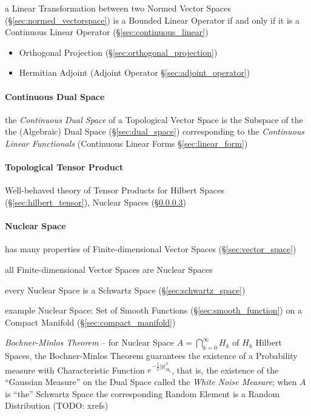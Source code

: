 a Linear Transformation between two Normed Vector Spaces
(\S\ref{sec:normed_vectorspace}) is a Bounded Linear Operator if and
only if it is a Continuous Linear Operator
(\S\ref{sec:continuous_linear})

\begin{itemize}
  \item Orthogonal Projection (\S\ref{sec:orthogonal_projection})
  \item Hermitian Adjoint (Adjoint Operator \S\ref{sec:adjoint_operator})
\end{itemize}



\paragraph{Continuous Dual Space}\label{sec:continuous_dual_space}
\hfill

the \emph{Continuous Dual Space} of a Topological Vector Space is the Subspace
of the the (Algebraic) Dual Space (\S\ref{sec:dual_space}) corresponding to the
\emph{Continuous Linear Functionals} (Continuous Linear Forms
\S\ref{sec:linear_form})



\paragraph{Topological Tensor Product}\label{sec:topological_tensor}
\hfill

Well-behaved theory of Tensor Products for Hilbert Spaces
(\S\ref{sec:hilbert_tensor}), Nuclear Spaces
(\S\ref{sec:nuclear_space})



\paragraph{Nuclear Space}\label{sec:nuclear_space}\hfill

has many properties of Finite-dimensional Vector Spaces
(\S\ref{sec:vector_space})

all Finite-dimensional Vector Spaces are Nuclear Spaces

every Nuclear Space is a Schwartz Space (\S\ref{sec:schwartz_space})

example Nuclear Space: Set of Smooth Functions
(\S\ref{sec:smooth_function}) on a Compact Manifold
(\S\ref{sec:compact_manifold})

\emph{Bochner-Minlos Theorem} -- for Nuclear Space
$A = \bigcap_{k=0}^\infty H_k$ of $H_k$ Hilbert Spaces, the Bochner-Minlos
Theorem guarantees the existence of a Probability measure with Characteristic
Function $e^{-\frac{1}{2}|y|_{H_0}^2}$, that is, the existence of the ``Gaussian
  Measure'' on the Dual Space called the \emph{White Noise Measure}; when $A$ is
  ``the'' Schwartz Space the corresponding Random Element is a Random
  Distribution (TODO: xrefs)



